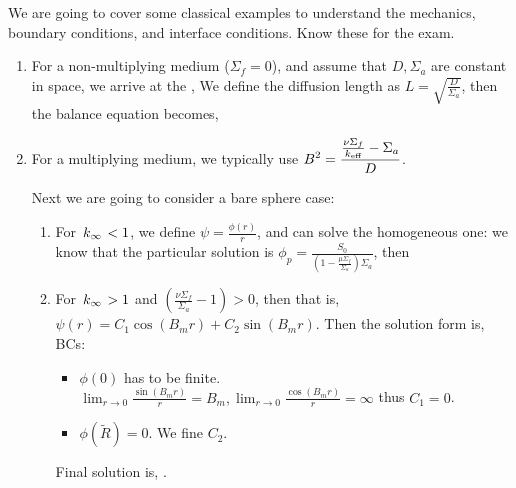 \documentclass{school-22.211-notes}
\date{March 21, 2012}
\begin{document}
\maketitle

 \label{1g-source}
We are going to cover some classical examples to understand the mechanics, boundary conditions, and interface conditions. Know these for the exam. 

\begin{enumerate}
\item For a non-multiplying medium ($\Sigma_f = 0$), and assume that $D, \Sigma_a$ are constant in space, we arrive at the , 
We define the diffusion length as $\displaystyle L = \sqrt{\frac{D}{\Sigma_a}}$, then the balance equation becomes, 

\item For a multiplying medium, we typically use $\displaystyle B^2 = \frac{\frac{\nu \Sigma_f}{\left. k_{\mathrm{eff}} \right.} - \Sigma_a}{D}$. 

Next we are going to consider a bare sphere case:
\begin{enumerate}
\item For $\left. k_{\infty} \right. < 1$, we define $\psi = \frac{\phi(r)}{r}$, and can solve the homogeneous one: 
we know that the particular solution is $\phi_p = \frac{S_0}{\left( 1 - \frac{\mu \Sigma_f}{\Sigma_a} \right) \Sigma_a}$, then 

\item For $\left. k_{\infty} \right. > 1$ and $\left( \frac{\nu \Sigma_f}{\Sigma_a} - 1 \right) > 0$, then 
that is, $\psi(r) = C_1 \cos (B_m r) + C_2 \sin (B_m r)$. Then the solution form is, 
BCs: 
\begin{itemize}
  \item $\phi(0)$ has to be finite. $\displaystyle \lim_{r \to 0} \frac{\sin(B_m r)}{r} = B_m, \lim_{r \to 0} \frac{\cos (B_mr)}{r} = \infty$ thus $C_1 = 0$. 
  \item $\phi(\tilde{R}) = 0$. We fine $C_2$. 
\end{itemize}
Final solution is, 
. 
\end{enumerate}


\end{enumerate}
\end{document}
